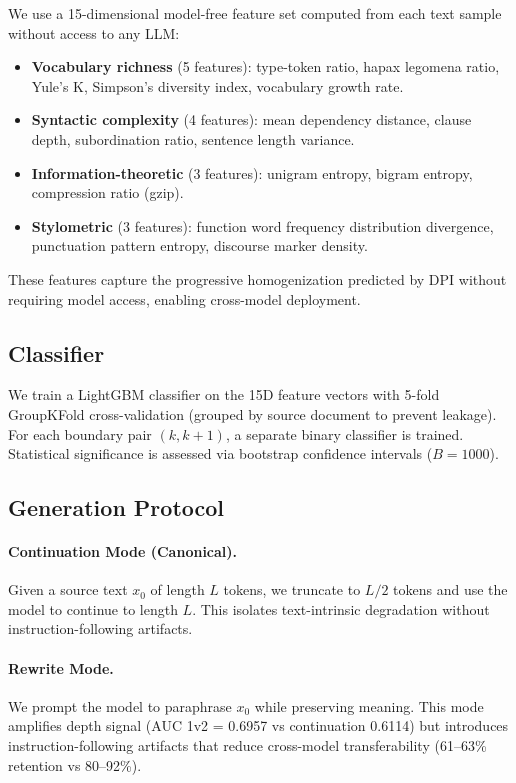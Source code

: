 \documentclass[11pt,a4paper]{article}
\begin{document}
We use a 15-dimensional model-free feature set computed from each text sample without access to any LLM:

\begin{itemize}[leftmargin=*,nosep]
\item \textbf{Vocabulary richness} (5 features): type-token ratio, hapax legomena ratio, Yule's K, Simpson's diversity index, vocabulary growth rate.
\item \textbf{Syntactic complexity} (4 features): mean dependency distance, clause depth, subordination ratio, sentence length variance.
\item \textbf{Information-theoretic} (3 features): unigram entropy, bigram entropy, compression ratio (gzip).
\item \textbf{Stylometric} (3 features): function word frequency distribution divergence, punctuation pattern entropy, discourse marker density.
\end{itemize}

These features capture the progressive homogenization predicted by DPI without requiring model access, enabling cross-model deployment.

\subsection{Classifier}

We train a LightGBM classifier on the 15D feature vectors with 5-fold GroupKFold cross-validation (grouped by source document to prevent leakage). For each boundary pair $(k, k{+}1)$, a separate binary classifier is trained. Statistical significance is assessed via bootstrap confidence intervals ($B=1000$).

\subsection{Generation Protocol}

\paragraph{Continuation Mode (Canonical).}
Given a source text $x_0$ of length $L$ tokens, we truncate to $L/2$ tokens and use the model to continue to length $L$. This isolates text-intrinsic degradation without instruction-following artifacts.

\paragraph{Rewrite Mode.}
We prompt the model to paraphrase $x_0$ while preserving meaning. This mode amplifies depth signal (AUC 1v2 = 0.6957 vs continuation 0.6114) but introduces instruction-following artifacts that reduce cross-model transferability (61--63\% retention vs 80--92\%).
\end{document}
